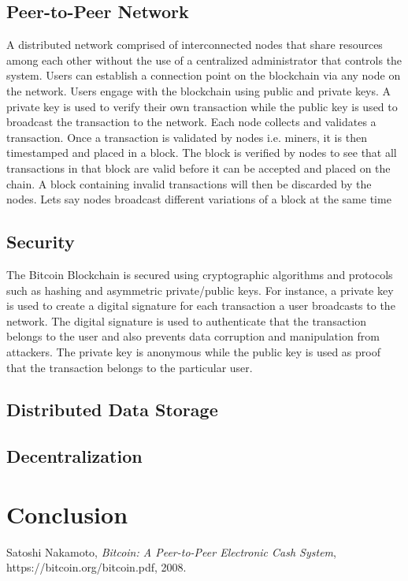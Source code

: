 \documentclass[report]{IEEEtran}
\begin{document}
\subsection{Peer-to-Peer Network}
A distributed network comprised of interconnected nodes that share resources among each other without the use of a centralized administrator that controls the system. Users can establish a connection point on the blockchain via any node on the network. Users engage with the blockchain using public and private keys. A private key is used to verify their own transaction while the public key is used to broadcast the transaction to the network. Each node collects and validates a transaction. Once a transaction is validated by nodes i.e. miners, it is then timestamped and placed in a block. The block is verified by nodes to see that all transactions in that block are valid before it can be accepted and placed on the chain. A block containing invalid transactions will then be discarded by the nodes. Lets say nodes broadcast different variations of a block at the same time
\subsection{Security}
The Bitcoin Blockchain is secured using cryptographic algorithms and protocols such as hashing and asymmetric private/public keys. For instance, a private key is used to create a digital signature for each transaction a user broadcasts to the network. The digital signature is used to authenticate that the transaction belongs to the user and also prevents data corruption and manipulation from attackers. The private key is anonymous while the public key is used as proof that the transaction belongs to the particular user. 
\subsection{Distributed Data Storage}
\subsection{Decentralization}
\section{Conclusion}

\begin{thebibliography}{1}

Satoshi Nakamoto, \emph{Bitcoin: A Peer-to-Peer Electronic Cash System}, https://bitcoin.org/bitcoin.pdf, 2008.

\end{thebibliography}
\end{document}
